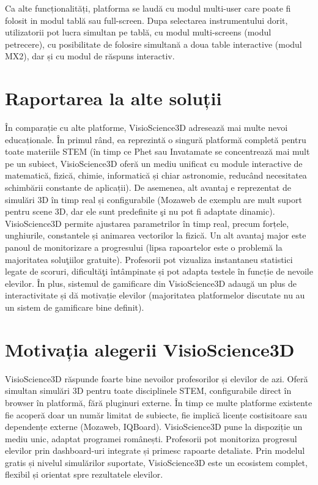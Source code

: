 Ca alte funcționalități, platforma se laudă cu modul multi-user care poate fi folosit in modul tablă sau full-screen.
Dupa selectarea instrumentului dorit, utilizatorii pot lucra simultan pe tablă, cu modul multi-screens (modul petrecere), 
cu posibilitate de folosire simultană a doua table interactive (modul MX2), dar și cu modul de răspuns interactiv.



\section{Raportarea la alte soluții}
\label{sub-sec:proj-scope}

În comparație cu alte platforme, VisioScience3D adresează mai multe nevoi educaționale. 
În primul rând, ea reprezintă o singură platformă completă pentru toate materiile STEM (în timp ce 
Phet sau Invatamate se concentrează mai mult pe un subiect, VisioScience3D oferă un mediu 
unificat cu module interactive de matematică, fizică, chimie, informatică și chiar astronomie, 
reducând necesitatea schimbării constante de aplicații). De asemenea, alt avantaj e reprezentat de
simulări 3D în timp real și configurabile (Mozaweb de exemplu are mult suport pentru scene 3D, dar ele sunt predefinite şi 
nu pot fi adaptate dinamic). VisioScience3D permite ajustarea parametrilor în timp real, precum 
forțele, unghiurile, constantele și animarea vectorilor la fizică. Un alt avantaj major este 
panoul de monitorizare a progresului (lipsa rapoartelor este o 
problemă la majoritatea soluţiilor gratuite). Profesorii pot vizualiza instantaneu statistici
legate de scoruri, dificultăţi întâmpinate și pot adapta testele în funcție de nevoile elevilor.
În plus, sistemul de gamificare din VisioScience3D adaugă
un plus de interactivitate și dă motivație elevilor (majoritatea platformelor discutate
nu au un sistem de gamificare bine definit).

\section{Motivația alegerii VisioScience3D}
\label{sub-sec:proj-motivatie}

VisioScience3D răspunde foarte bine nevoilor profesorilor și elevilor de azi.
Oferă simultan simulări 3D pentru toate disciplinele STEM, configurabile 
direct în browser în platformă, fără pluginuri externe. În timp ce multe platforme 
existente fie acoperă doar un număr limitat de subiecte, fie implică licențe costisitoare
sau dependențe externe (Mozaweb, IQBoard). VisioScience3D pune la dispoziție un mediu unic,
adaptat programei românești. Profesorii pot monitoriza progresul elevilor prin dashboard-uri
integrate și primesc rapoarte detaliate. Prin modelul gratis și nivelul simulărilor suportate,
VisioScience3D este un ecosistem complet, flexibil și orientat spre rezultatele elevilor.